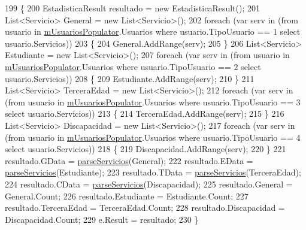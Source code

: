 \begin{DoxyCode}
199         \{
200             EstadisticaResult resultado = \textcolor{keyword}{new} EstadisticaResult();
201             List<Servicio> General = \textcolor{keyword}{new} List<Servicio>();
202             \textcolor{keywordflow}{foreach} (var serv \textcolor{keywordflow}{in} (from usuario \textcolor{keywordflow}{in} \hyperlink{class_proyecto___integrador__3_1_1_reportes_1_1_reporte_frecuencia_de_uso_ad66e9ccc04488afa646ac2e65bf7db35}{mUsuariosPopulator}.Usuarios where 
      usuario.TipoUsuario == 1 select usuario.Servicios))
203             \{
204                 General.AddRange(serv);
205             \}
206             List<Servicio> Estudiante = \textcolor{keyword}{new} List<Servicio>();
207             \textcolor{keywordflow}{foreach} (var serv \textcolor{keywordflow}{in} (from usuario \textcolor{keywordflow}{in} \hyperlink{class_proyecto___integrador__3_1_1_reportes_1_1_reporte_frecuencia_de_uso_ad66e9ccc04488afa646ac2e65bf7db35}{mUsuariosPopulator}.Usuarios where 
      usuario.TipoUsuario == 2 select usuario.Servicios))
208             \{
209                 Estudiante.AddRange(serv);
210             \}
211             List<Servicio> TerceraEdad = \textcolor{keyword}{new} List<Servicio>();
212             \textcolor{keywordflow}{foreach} (var serv \textcolor{keywordflow}{in} (from usuario \textcolor{keywordflow}{in} \hyperlink{class_proyecto___integrador__3_1_1_reportes_1_1_reporte_frecuencia_de_uso_ad66e9ccc04488afa646ac2e65bf7db35}{mUsuariosPopulator}.Usuarios where 
      usuario.TipoUsuario == 3 select usuario.Servicios))
213             \{
214                 TerceraEdad.AddRange(serv);
215             \}
216             List<Servicio> Discapacidad = \textcolor{keyword}{new} List<Servicio>();
217             \textcolor{keywordflow}{foreach} (var serv \textcolor{keywordflow}{in} (from usuario \textcolor{keywordflow}{in} \hyperlink{class_proyecto___integrador__3_1_1_reportes_1_1_reporte_frecuencia_de_uso_ad66e9ccc04488afa646ac2e65bf7db35}{mUsuariosPopulator}.Usuarios where 
      usuario.TipoUsuario == 4 select usuario.Servicios))
218             \{
219                 Discapacidad.AddRange(serv);
220             \}
221             resultado.GData = \hyperlink{class_proyecto___integrador__3_1_1_reportes_1_1_reporte_frecuencia_de_uso_ad858394f90552b0c6240293e2acf2bdd}{parseServicios}(General);
222             resultado.EData = \hyperlink{class_proyecto___integrador__3_1_1_reportes_1_1_reporte_frecuencia_de_uso_ad858394f90552b0c6240293e2acf2bdd}{parseServicios}(Estudiante);
223             resultado.TData = \hyperlink{class_proyecto___integrador__3_1_1_reportes_1_1_reporte_frecuencia_de_uso_ad858394f90552b0c6240293e2acf2bdd}{parseServicios}(TerceraEdad);
224             resultado.CData = \hyperlink{class_proyecto___integrador__3_1_1_reportes_1_1_reporte_frecuencia_de_uso_ad858394f90552b0c6240293e2acf2bdd}{parseServicios}(Discapacidad);
225             resultado.General = General.Count;
226             resultado.Estudiante = Estudiante.Count;
227             resultado.TerceraEdad = TerceraEdad.Count;
228             resultado.Discapacidad = Discapacidad.Count;
229             e.Result = resultado;
230         \}
\end{DoxyCode}
